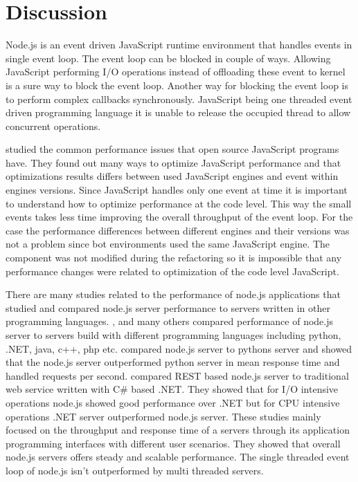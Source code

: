 \chapter{Discussion\label{discussion}}
Node.js is an event driven JavaScript runtime environment that handles events in single event loop.
The event loop can be blocked in couple of ways.
Allowing JavaScript performing I/O operations instead of offloading these event to kernel is a sure way to block the event loop.
Another way for blocking the event loop is to perform complex callbacks synchronously.
JavaScript being one threaded event driven programming language it is unable to release the occupied thread to allow concurrent operations.

\cite{SelakovicPerformanceIssues} studied the common performance issues that open source JavaScript programs have.
They found out many ways to optimize JavaScript performance and that optimizations results differs between used JavaScript engines and event within engines versions.
Since JavaScript handles only one event at time it is important to understand how to optimize performance at the code level.
This way the small events takes less time improving the overall throughput of the event loop.
For the case the performance differences between different engines and their versions was not a problem since bot environments used the same JavaScript engine.
The component was not modified during the refactoring so it is impossible that any performance changes were related to optimization of the code level JavaScript.

There are many studies related to the performance of node.js applications that studied and compared node.js server performance to servers written in other programming languages.
\cite{Challapalli}, \cite{Lion} and many others compared performance of node.js server to servers build with different programming languages including python, .NET, java, c++, php etc.
\cite{Challapalli} compared node.js server to pythons server and showed that the node.js server outperformed python server in mean response time and handled requests per second.
\cite{Chitra} compared REST based node.js server to traditional web service written with C\# based .NET.
They showed that for I/O intensive operations node.js showed good performance over .NET but
for CPU intensive operations .NET server outperformed node.js server.
These studies mainly focused on the throughput and response time of a servers through its application programming interfaces with different user scenarios.
They showed that overall node.js servers offers steady and scalable performance.
The single threaded event loop of node.js isn't outperformed by multi threaded servers.

